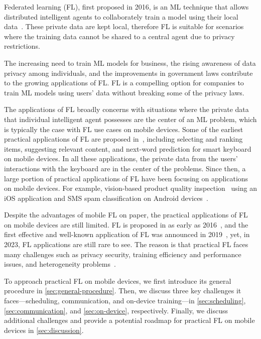 \documentclass[conference]{IEEEtran}
\begin{document}
Federated learning (FL), first proposed in 2016, is an ML technique that
allows distributed intelligent agents to collaborately train a model using
their local data~\cite{mcmahan2017communication,yang2019federated}.
These private data are kept local,
therefore FL is suitable for scenarios where
the training data cannot be shared to a central agent due to
privacy restrictions.

The increasing need to train ML models for business,
the rising awareness of data privacy among individuals,
and the improvements in government laws contribute to
the growing applications of FL.
FL is a compelling option for companies to train ML models using users' data
without breaking some of the privacy laws.

The applications of FL broadly concerns with situations where
the private data that individual intelligent agent possesses are
the center of an ML problem,
which is typically the case with FL use cases on mobile devices.
Some of the earliest practical applications of FL are proposed
in~\cite{bonawitz2019towards},
including selecting and ranking items, suggesting relevant content,
and next-word prediction for smart keyboard on mobile devices.
In all these applications,
the private data from the users' interactions with
the keyboard are in the center of the problems.
Since then, a large portion of practical applications of FL have been
focusing on applications on mobile devices.
For example, vision-based product quality inspection~\cite{bharti2022edge} using
an iOS application and
SMS spam classification on Android devices~\cite{sriraman2022device}.

Despite the advantages of mobile FL on paper,
the practical applications of FL on mobile devices are still limited.
FL is proposed in as early as 2016~\cite{mcmahan2017communication},
and the first effective and well-known application of FL
was announced in 2019~\cite{bonawitz2019towards},
yet, in 2023, FL applications are still rare to see.
The reason is that practical FL faces many challenges such as
privacy security, training efficiency and performance issues,
and heterogeneity problems~\cite{wen2023survey}.

To approach practical FL on mobile devices,
we first introduce its general procedure in \ref{sec:general-procedure}.
Then, we discuss three key challenges it faces—scheduling, communication, and
on-device training—in \ref{sec:scheduling}, \ref{sec:communication}, and
\ref{sec:on-device}, respectively.
Finally, we discuss additional challenges and
provide a potential roadmap for practical FL on mobile devices in
\ref{sec:discussion}.
\end{document}
